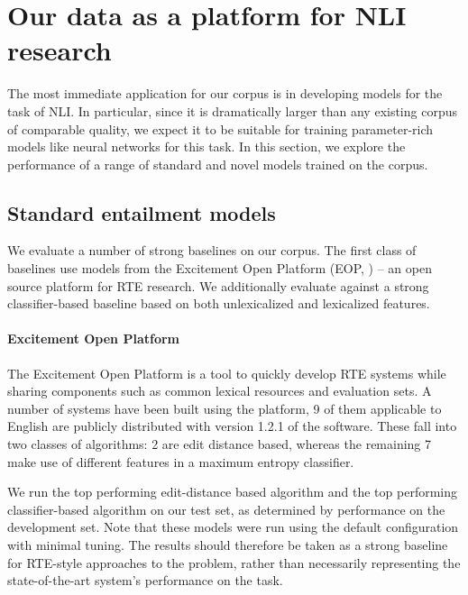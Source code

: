 \section{Our data as a platform for NLI research}

The most immediate application for our corpus is in developing models for the task of NLI. In particular, since it is dramatically larger than any existing corpus of comparable quality, we expect it to be suitable for training  parameter-rich models like neural networks for this task. In this section, we explore the performance of a range of standard and novel models trained on the corpus.

\subsection{Standard entailment models}
We evaluate a number of strong baselines on our corpus.
The first class of baselines use models from the Excitement Open
  Platform (EOP,
  \citealt{pado2014design,magnini2014excitement})
  -- an open source platform for RTE research.
We additionally evaluate against a strong classifier-based baseline based on
  both  unlexicalized and lexicalized features.


%
%
\paragraph{Excitement Open Platform}
The Excitement Open Platform is a tool to quickly develop RTE systems
  while sharing components such as common lexical resources and 
  evaluation sets.
A number of systems have been built using the platform, 9 of them
  applicable to English are publicly distributed with version 1.2.1
  of the software.
These fall into two classes of algorithms: 2 are edit distance based,
  whereas the remaining 7 make use of different features in a
  maximum entropy classifier.

We run the top performing edit-distance based algorithm and the top
  performing classifier-based algorithm on our test set, as
  determined by performance on the development set.
Note that these models were run using the default configuration
  with minimal tuning.
The results should therefore be taken as a strong baseline for
  RTE-style approaches to the problem, rather than necessarily
  representing the state-of-the-art system's performance on the
  task.

